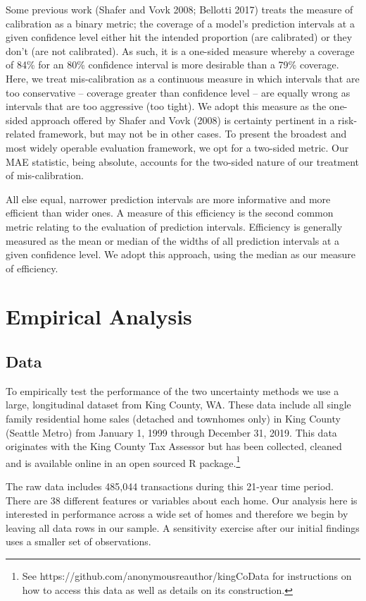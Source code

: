 \documentclass[colTwo]{anon}
\theoremstyle{definition}
\begin{document}
Some previous work (Shafer and Vovk 2008; Bellotti 2017) treats the measure of calibration as a binary metric; the coverage of a model’s prediction intervals at a given confidence level either hit the intended proportion (are calibrated) or they don’t (are not calibrated).  As such, it is a one-sided measure whereby a coverage of 84\% for an 80\% confidence interval is more desirable than a 79\% coverage.  Here, we treat mis-calibration as a continuous measure in which intervals that are too conservative -- coverage greater than confidence level -- are equally wrong as intervals that are too aggressive (too tight). We adopt this measure as the one-sided approach offered by Shafer and Vovk (2008) is certainty pertinent in a risk-related framework, but may not be in other cases.  To present the broadest and most widely operable evaluation framework, we opt for a two-sided metric.  Our MAE statistic, being absolute, accounts for the two-sided nature of our treatment of mis-calibration.  

All else equal, narrower prediction intervals are more informative and more efficient than wider ones.  A measure of this efficiency is the second common metric relating to the evaluation of prediction intervals.  Efficiency is generally measured as the mean or median of the widths of all prediction intervals at a given confidence level.  We adopt this approach, using the median as our measure of efficiency. 

\section{Empirical Analysis}

\subsection{Data}

To empirically test the performance of the two uncertainty methods we use a large, longitudinal dataset from King County, WA.  These data include all single family residential home sales (detached and townhomes only) in King County (Seattle Metro) from January 1, 1999 through December 31, 2019. This data originates with the King County Tax Assessor but has been collected, cleaned and is available online in an open sourced R package.\footnote{See https://github.com/anonymousreauthor/kingCoData for instructions on how to access this data as well as details on its construction.}

The raw data includes 485,044 transactions during this 21-year time period.  There are 38 different features or variables about each home. Our analysis here is interested in performance across a wide set of homes and therefore we begin by leaving all data rows in our sample.  A sensitivity exercise after our initial findings uses a smaller set of observations.
\end{document}
